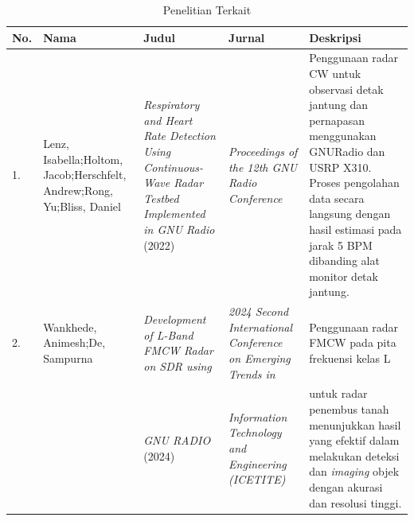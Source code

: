 \begin{center}			%
	\begin{longtable}{|p{0.5cm}|p{2cm}|p{3cm}|p{2.5cm}|p{3cm}|}
	\caption{Penelitian Terkait}
	\label{tab:PenelitianDulu}\\
	\hline
	\textbf{No.} & \textbf{Nama} & \textbf{Judul} &\textbf{Jurnal} & \textbf{Deskripsi}\\
	\hline
	1.& Lenz, Isabella;\newline Holtom, Jacob;\newline Herschfelt, Andrew;\newline Rong, Yu;\newline Bliss, Daniel 
	& \textit{Respiratory and Heart Rate Detection Using Continuous-Wave Radar Testbed Implemented in GNU Radio } (2022) \cite{Lenz2022}
	& \textit{Proceedings of the 12th GNU Radio Conference}
	& Penggunaan radar CW untuk observasi detak jantung dan pernapasan menggunakan GNURadio dan USRP X310. Proses pengolahan data secara langsung dengan hasil estimasi pada jarak 5 BPM dibanding alat monitor detak jantung. 
	\\ \hline
	2. 	& Wankhede, Animesh;\newline De, Sampurna
	& \textit{Development of L-Band FMCW Radar on SDR using}
	& \textit{2024 Second International Conference on Emerging Trends in}
	& Penggunaan radar FMCW pada pita frekuensi kelas L \\
	&	
	&\textit{ GNU RADIO} (2024) \cite{Wankhede2024}
	& \textit{Information Technology and Engineering (ICETITE)} 
	&  untuk radar penembus tanah menunjukkan hasil yang efektif dalam melakukan deteksi dan \textit{imaging} objek dengan akurasi dan resolusi tinggi. 
	
	\\ \hline
	

\end{longtable}
\end{center}
